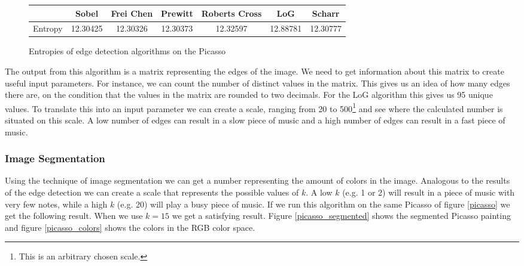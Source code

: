 \documentclass[12pt]{article}
\begin{document}
\begin{figure}
\begin{tabular}{| c | c | c | c | c | c | c |}
\hline
& Sobel & Frei Chen & Prewitt & Roberts Cross & LoG & Scharr \\
\hline
Entropy & 12.30425 & 12.30326 & 12.30373 & 12.32597 & 12.88781 & 12.30777 \\ 
\hline
\end{tabular}
\caption{Entropies of edge detection algorithms on the Picasso}
\label{entropy_results}
\end{figure} 

The output from this algorithm is a matrix representing the edges of the image. We need to get information about this matrix to create useful input parameters. For instance, we can count the number of distinct values in the matrix. This gives us an idea of how many edges there are, on the condition that the values in the matrix are rounded to two decimals. For the LoG algorithm this gives us 95 unique values. To translate this into an input parameter we can create a scale, ranging from 20 to 500\footnote{This is an arbitrary chosen scale.} and see where the calculated number is situated on this scale. A low number of edges can result in a slow piece of music and a high number of edges can result in a fast piece of music.

\subsubsection{Image Segmentation}

Using the technique of image segmentation we can get a number representing the amount of colors in the image. Analogous to the results of the edge detection we can create a scale that represents the possible values of $k$. A low $k$ (e.g. 1 or 2) will result in a piece of music with very few notes, while a high $k$ (e.g. 20) will play a busy piece of music. If we run this algorithm on the same Picasso of figure \ref{picasso} we get the following result. When we use $k = 15$ we get a satisfying result. Figure \ref{picasso_segmented} shows the segmented Picasso painting and figure \ref{picasso_colors} shows the colors in the RGB color space.
\end{document}
